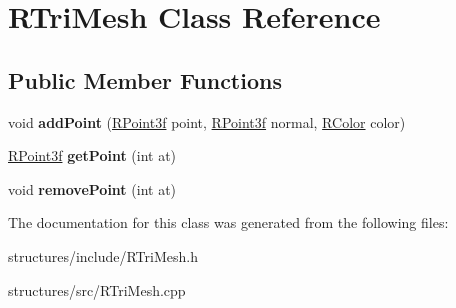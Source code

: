 \hypertarget{classRTriMesh}{
\section{RTriMesh Class Reference}
\label{classRTriMesh}
}
\subsection*{Public Member Functions}
\begin{DoxyCompactItemize}
\item 
\hypertarget{classRTriMesh_aa6fc41bb284fcf611407ba8a8eed6d2d}{
void {\bfseries addPoint} (\hyperlink{classRPoint3f}{RPoint3f} point, \hyperlink{classRPoint3f}{RPoint3f} normal, \hyperlink{classRColor}{RColor} color)}
\label{classRTriMesh_aa6fc41bb284fcf611407ba8a8eed6d2d}

\item 
\hypertarget{classRTriMesh_a4950038ac0141f177284a2defb22ae04}{
\hyperlink{classRPoint3f}{RPoint3f} {\bfseries getPoint} (int at)}
\label{classRTriMesh_a4950038ac0141f177284a2defb22ae04}

\item 
\hypertarget{classRTriMesh_a3e20aff5157c9b99d7ab6fa67dd83e33}{
void {\bfseries removePoint} (int at)}
\label{classRTriMesh_a3e20aff5157c9b99d7ab6fa67dd83e33}

\end{DoxyCompactItemize}


The documentation for this class was generated from the following files:\begin{DoxyCompactItemize}
\item 
structures/include/RTriMesh.h\item 
structures/src/RTriMesh.cpp\end{DoxyCompactItemize}
